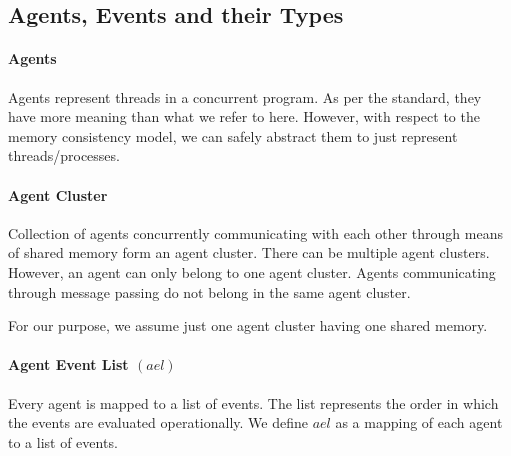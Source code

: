 \subsection{Agents, Events and their Types}

    \paragraph{Agents}
       Agents represent threads in a concurrent program. As per the standard, they have more meaning than what we refer to here. However, with respect to the memory consistency model, we can safely abstract them to just represent threads/processes.

    \paragraph{Agent Cluster}
        Collection of agents concurrently communicating with each other through means of shared memory form an agent cluster.  There can be multiple agent clusters. However, an agent can only belong to one agent cluster. Agents communicating through message passing do not belong in the same agent cluster. 

        For our purpose, we assume just one agent cluster having one shared memory. 

    \paragraph{Agent Event List $(ael)$}
        Every agent is mapped to a list of events. The list represents the order in which the events are evaluated operationally\footnotemark. We define $ael$ as a mapping of each agent to a list of events.
        

        

            

